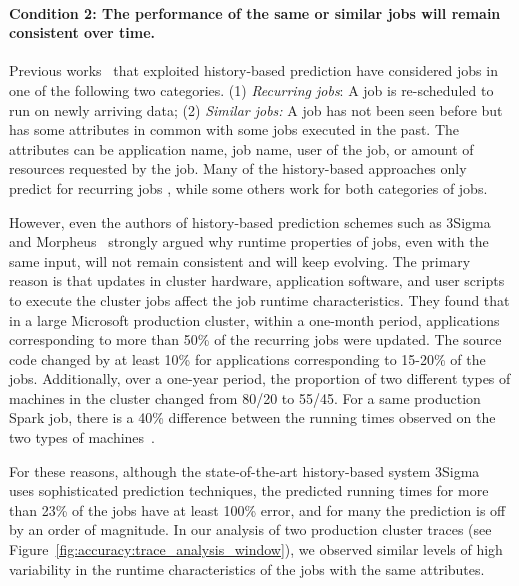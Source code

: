 \paragraph{Condition 2: The performance of the same
{or similar} jobs will remain consistent over time.}
Previous works~\cite{3Sigma, morpheus, corral, jockey:eurosys2012} that exploited
history-based prediction have considered jobs in one of
the following two categories.
(1) {\em Recurring jobs}: A job is re-scheduled to run on newly arriving data;
(2) {\em Similar jobs:} A job has not been seen before but has some
attributes in common with some jobs executed in the past. The
attributes can be application name, job name, user of
the job, or amount of resources requested by the job.
Many of the history-based approaches only predict for recurring jobs \cite{morpheus, corral,
jockey:eurosys2012}, while some others \cite{3Sigma, jamiasvu, stratus:socc2018, roughSetEstimation:IEEE:Shonali} work for both categories of jobs.

However, even the authors of history-based prediction schemes such as
3Sigma~\cite{3Sigma} and Morpheus~\cite{morpheus} strongly argued why
runtime properties of jobs, even with the same input, will not remain consistent
and will keep evolving.  The primary reason is that updates in cluster
hardware, application software, and user scripts to execute the cluster jobs
affect the job runtime characteristics.
{They found that}
in a large Microsoft production cluster, within a one-month period,
applications corresponding to more than 50\% of the recurring jobs were
updated. The source code changed by at least 10\% for applications
corresponding to 15-20\% of the jobs.  Additionally, over a one-year period,
the proportion of two different types of machines in the cluster
changed from 80/20 to 55/45. For a same production Spark job, there is
a 40\% difference between the running times observed on the two types of
machines~\cite{morpheus}.  

For these reasons, although the state-of-the-art history-based system 3Sigma~\cite{3Sigma} 
uses sophisticated prediction techniques,
the predicted running times for more than 23\% of the jobs have at
least 100\% error, and for many the prediction is off by an order of
magnitude. In our analysis of two production cluster traces (see
Figure~\ref{fig:accuracy:trace_analysis_window}), we observed similar
levels of high variability in the runtime characteristics of the jobs with the same
attributes.

